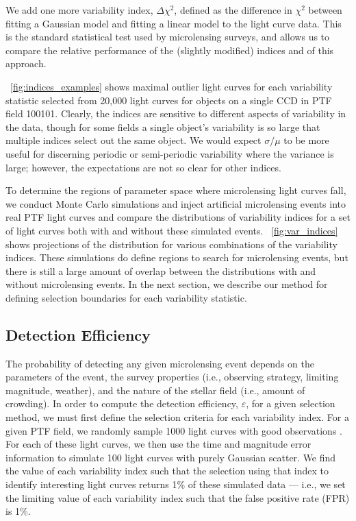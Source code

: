 \documentclass{emulateapj}
\newcommand{\apwsim}{\raisebox{0.2ex}{\scriptsize$\sim$\normalsize}}
\begin{document}
We add one more variability index, $\Delta \chi^2$, defined as the difference in $\chi^2$ between fitting a Gaussian model and fitting a linear model to the light curve data. This is the standard statistical test used by microlensing surveys, and allows us to compare the relative performance of the (slightly modified) \cite{shin2009} indices and of this approach. 

\figurename~\ref{fig:indices_examples} shows maximal outlier light curves for each variability statistic selected from \apwsim20,000 light curves for objects on a single CCD in PTF field 100101. Clearly, the indices are sensitive to different aspects of variability in the data, though for some fields a single object's variability is so large that multiple indices select out the same object. We would expect $\sigma/\mu$ to be more useful for discerning periodic or semi-periodic variability where the variance is large; however, the expectations are not so clear for other indices. 

To determine the regions of parameter space where microlensing light curves fall, we conduct Monte Carlo simulations and inject artificial microlensing events into real PTF light curves and compare the distributions of variability indices for a set of light curves both with and without these simulated events. \figurename~\ref{fig:var_indices} shows projections of the distribution for various combinations of the variability indices. These simulations do define regions to search for microlensing events, but there is still a large amount of overlap between the distributions with and without microlensing events. In the next section, we describe our method for defining selection boundaries for each variability statistic.


\subsection{Detection Efficiency}
The probability of detecting any given microlensing event depends on the parameters of the event, the survey properties (i.e., observing strategy, limiting magnitude, weather), and the nature of the stellar field (i.e., amount of crowding). In order to compute the detection efficiency, $\varepsilon$, for a given selection method, we must first define the selection criteria for each variability index. For a given PTF field, we randomly sample 1000 light curves with good observations \citep[these have no photometric flags; see description of processing pipeline in][]{nick2009}. For each of these light curves, we then use the time and magnitude error information to simulate 100 light curves with purely Gaussian scatter. We find the value of each variability index such that the selection using that index to identify interesting light curves returns 1\% of these simulated data --- i.e., we set the limiting value of each variability index such that the false positive rate (FPR) is 1\%.
\end{document}
